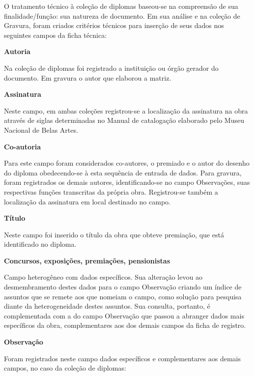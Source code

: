 O tratamento técnico à coleção de diplomas baseou-se na compreensão de sua finalidade/função: sua natureza de documento. Em sua análise e na coleção de Gravura, foram criados critérios técnicos para inserção de seus dados nos seguintes campos da ficha técnica:

\textbf{Autoria}

Na coleção de diplomas foi registrado a instituição ou órgão gerador do documento. Em gravura o autor que elaborou a matriz.

\textbf{Assinatura}

Neste campo, em ambas coleções registrou-se a localização da assinatura na obra através de siglas determinadas no Manual de catalogação elaborado pelo Museu Nacional de Belas Artes.

\textbf{Co-autoria}

Para este campo foram considerados co-autores, o premiado e o autor do desenho do diploma obedecendo-se à esta sequência de entrada de dados. Para gravura, foram registrados os demais autores, identificando-se no campo Observações, suas respectivas funções transcritas da própria obra. Registrou-se também a localização da assinatura em local destinado no campo.

\textbf{Título}

Neste campo foi inserido o título da obra que obteve premiação, que está identificado no diploma.

\textbf{Concursos, exposições, premiações, pensionistas}

Campo heterogêneo com dados específicos. Sua alteração levou ao desmembramento destes dados para o campo Observação criando um índice de assuntos que se remete aos que nomeiam o campo, como solução para pesquisa diante da heterogeneidade destes assuntos. Sua consulta, portanto, é complementada com a do campo Observação que passou a abranger dados mais específicos da obra, complementares aos dos demais campos da ficha de registro.

\textbf{Observação}

Foram registrados neste campo dados específicos e complementares aos demais campos, no caso da coleção de diplomas:

